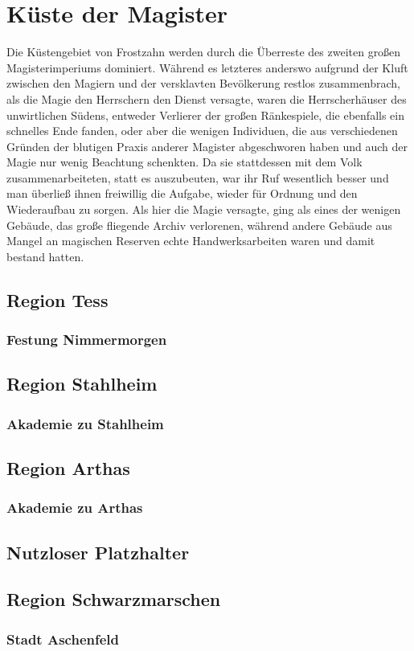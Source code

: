 \documentclass[a4paper,12pt,oneside]{book}
\begin{document}
\section{Küste der Magister}
Die Küstengebiet von Frostzahn werden durch die Überreste des zweiten großen Magisterimperiums dominiert. Während es letzteres anderswo aufgrund der Kluft zwischen den Magiern und der versklavten Bevölkerung restlos zusammenbrach, als die Magie den Herrschern den Dienst versagte, waren die Herrscherhäuser des unwirtlichen Südens, entweder Verlierer der großen Ränkespiele, die ebenfalls ein schnelles Ende fanden, oder aber die wenigen Individuen, die aus verschiedenen Gründen der blutigen Praxis anderer Magister abgeschworen haben und auch der Magie nur wenig Beachtung schenkten. Da sie stattdessen mit dem Volk zusammenarbeiteten, statt es auszubeuten, war ihr Ruf wesentlich besser und man überließ ihnen freiwillig die Aufgabe, wieder für Ordnung und den Wiederaufbau zu sorgen. Als hier die Magie versagte, ging als eines der wenigen Gebäude, das große fliegende Archiv verlorenen, während andere Gebäude aus Mangel an magischen Reserven echte Handwerksarbeiten waren und damit bestand hatten.

\subsection{Region Tess}

\subsubsection{Festung Nimmermorgen}

\subsection{Region Stahlheim}

\subsubsection{Akademie zu Stahlheim}

\subsection{Region Arthas}

\subsubsection{Akademie zu Arthas}

\subsection{Nutzloser Platzhalter}

\subsection{Region Schwarzmarschen}

\subsubsection{Stadt Aschenfeld}
\end{document}
